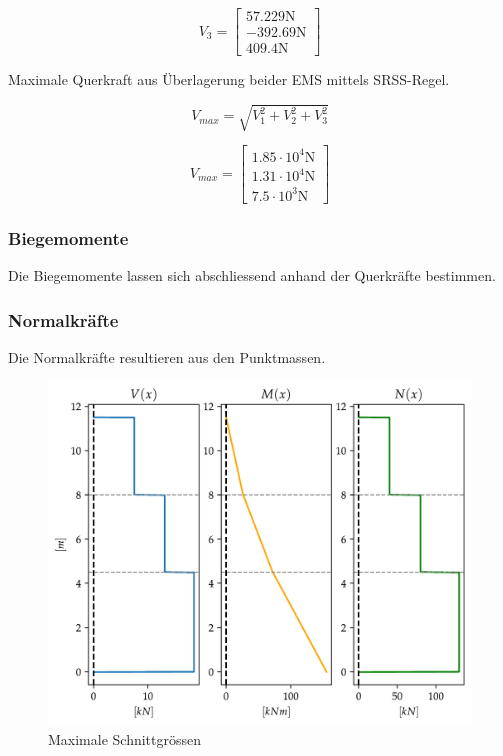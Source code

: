 \documentclass[
  letterpaper,
  DIV=11]{scrreprt}
\begin{document}
\begin{equation}V_{3} = \left[\begin{matrix}57.229 \text{N}\\- 392.69 \text{N}\\409.4 \text{N}\end{matrix}\right]\end{equation}

Maximale Querkraft aus Überlagerung beider EMS mittels SRSS-Regel.

\[
V_{max} = \sqrt{V_1^2 + V_2^2 + V_3^2}
\]

\begin{equation}V_{max} = \left[\begin{matrix}1.85 \cdot 10^{4} \text{N}\\1.31 \cdot 10^{4} \text{N}\\7.5 \cdot 10^{3} \text{N}\end{matrix}\right]\end{equation}

\hypertarget{biegemomente}{%
\subsubsection{Biegemomente}\label{biegemomente}}

Die Biegemomente lassen sich abschliessend anhand der Querkräfte
bestimmen.

\hypertarget{normalkruxe4fte}{%
\subsubsection{Normalkräfte}\label{normalkruxe4fte}}

Die Normalkräfte resultieren aus den Punktmassen.

\begin{figure}[H]

{\centering \includegraphics{index_files/mediabag/mms_04_files/figure-pdf/fig-schnittgroessen-output-1.pdf}

}

\caption{\label{fig-schnittgroessen}Maximale Schnittgrössen}

\end{figure}
\end{document}

